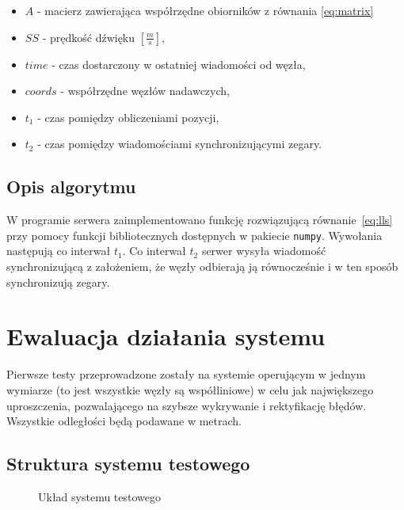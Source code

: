 \begin{itemize}
    \item $A$ - macierz zawierająca współrzędne obiorników z równania \ref{eq:matrix}
    \item $SS$ {-} prędkość dźwięku $\left[\frac{m}{s}\right]$,
    \item $time$ {-} czas dostarczony w ostatniej wiadomości od węzła,
    \item $coords$ {-} współrzędne węzłów nadawczych,
    \item $t_1$ {-} czas pomiędzy obliczeniami pozycji,
    \item $t_2$ {-} czas pomiędzy wiadomościami synchronizującymi zegary.
\end{itemize}

\subsection{Opis algorytmu}

W programie serwera zaimplementowano funkcję rozwiązującą równanie~\ref{eq:lls} przy pomocy funkcji bibliotecznych dostępnych w pakiecie \texttt{numpy}. Wywołania następują co interwał $t_1$. Co interwał $t_2$ serwer wysyła wiadomość synchronizującą z założeniem, że węzły odbierają ją równocześnie i w ten sposób synchronizują zegary.

\section{Ewaluacja działania systemu}

Pierwsze testy przeprowadzone zostały na systemie operującym w jednym wymiarze (to jest wszystkie węzły są współliniowe) w celu jak największego uproszczenia, pozwalającego na szybsze wykrywanie i rektyfikację błędów. Wszystkie odległości będą podawane w metrach.

\subsection{Struktura systemu testowego}

\begin{figure}[h]
    \centering
    \caption{Układ systemu testowego}
    \label{fig:test_setup}
\end{figure}

